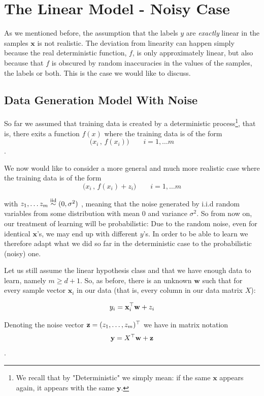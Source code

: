\section{The Linear Model - Noisy Case }

As we mentioned before, the assumption that the labels $y$ are \textit{exactly} linear in the samples $\mathbf{x}$ is not realistic. The deviation from linearity can happen simply because the real deterministic function, $f$, is only approximately linear, but also because that $f$ is obscured by random inaccuracies in the values of the samples, the labels or both. This is the case we would like to discuss.

\subsection{Data Generation Model With Noise}

So far we assumed that training data is created by a deterministic process\footnote{We recall that by "Deterministic" we simply mean: if the same $\mathbf{x}$ appears again, it appears with the same $\mathbf{y}$.}, that is, there exits a function $f(x)$ where the training data is of the form
 \[
  \Big(x_i \,,\, f(x_i)\Big) \qquad i=1,\ldots m
 \].

We now would like to consider a more general and much more realistic case where the training data is of the form
  \[
  \Big(x_i \,,\, f(x_i) + z_i \Big) \qquad i=1,\ldots m
 \]

with $z_1,\ldots z_m\stackrel{\text{iid}}{\sim} (0,\sigma^2)$ , meaning that the noise generated by i.i.d random variables from some distribution with mean $0$ and variance $\sigma^2$. So from now on, our treatment of learning will be probabilistic: Due to the random noise, even for identical $\mathbf{x}$'s, we may end up with different $y$'s. In order to be able to learn we therefore adapt what we did so far in the deterministic case to the probabilistic (noisy) one.

Let us still assume the linear hypothesis class and that we have enough data to learn, namely $m\geq d+1$. So, as before, there is an unknown $\mathbf{w}$ such that for every sample vector $\mathbf{x}_i$ in our data (that is, every column in our data matrix $X$):


$$y_i=\mathbf{x}_i^{\top} \mathbf{w}+z_i$$


Denoting the noise vector $\mathbf{z}=(z_1,\ldots,z_m)^{\top}$ we have in matrix notation
$$\mathbf{y}=X^{\top}\mathbf{w}+\mathbf{z}$$.

